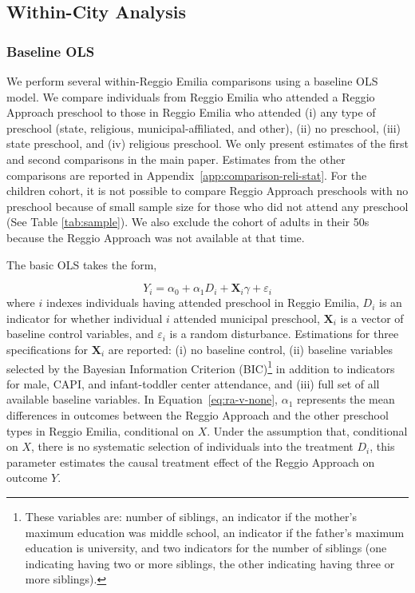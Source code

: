 \subsection{Within-City Analysis} \label{sec:within-city-analysis}
\subsubsection{Baseline OLS} \label{subsubsection:OLS}
We perform several within-Reggio Emilia comparisons using a baseline OLS model. We compare individuals from Reggio Emilia who attended a Reggio Approach preschool to those in Reggio Emilia who attended (i) any type of preschool (state, religious, municipal-affiliated, and other), (ii) no preschool, (iii) state preschool, and (iv) religious preschool. We only present estimates of the first and second comparisons in the main paper. Estimates from the other comparisons are reported in Appendix~\ref{app:comparison-reli-stat}. %
For the children cohort, it is not possible to compare Reggio Approach preschools with no preschool because of small sample size for those who did not attend any preschool (See Table \ref{tab:sample}). We also exclude the cohort of adults in their 50s because the Reggio Approach was not available at that time. 

The basic OLS takes the form, 

\begin{equation}
	Y_i = \alpha_0 + \alpha_1 D_i + \bm{X}_i\gamma + \varepsilon_i
	\label{eq:ra-v-none}
\end{equation}
where $i$ indexes individuals having attended preschool in Reggio Emilia, $D_i$ is an indicator for whether individual $i$ attended municipal preschool, $\bm{X}_i$ is a vector of baseline control variables, and $\varepsilon_i$ is a random disturbance. Estimations for three specifications for $\bm{X}_i$ are reported: (i) no baseline control, (ii) baseline variables selected by the Bayesian Information Criterion (BIC)\footnote{These variables are: number of siblings, an indicator if the mother's maximum education was middle school, an indicator if the father's maximum education is university, and two indicators for the number of siblings (one indicating having two or more siblings, the other indicating having three or more siblings).} in addition to indicators for male, CAPI, and infant-toddler center attendance, and (iii) full set of all available baseline variables. In Equation~\ref{eq:ra-v-none}, $\alpha_1$ represents the mean differences in outcomes between the Reggio Approach and the other preschool types in Reggio Emilia, conditional on $X$. Under the assumption that, conditional on $X$, there is no systematic selection of individuals into the treatment $D_i$, this parameter estimates the causal treatment effect of the Reggio Approach on outcome $Y$.

